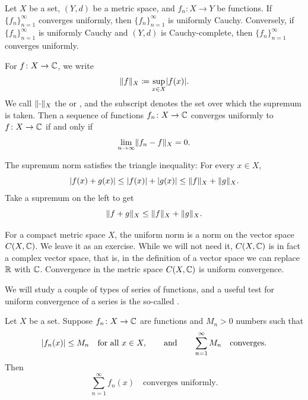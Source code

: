\begin{prop} \label{prop:unifcauchymetric}
Let $X$ be a set, $(Y,d)$ be a metric space, and
$f_n \colon X \to Y$ be functions.
If $\{ f_n \}_{n=1}^\infty$ converges uniformly,
then $\{f_n\}_{n=1}^\infty$ is uniformly Cauchy.  Conversely, if 
$\{f_n\}_{n=1}^\infty$ is uniformly Cauchy and $(Y,d)$ is Cauchy-complete,
then $\{f_n\}_{n=1}^\infty$ converges uniformly.
\end{prop}

For $f \colon X \to {\mathbb{C}}$, we write
\begin{equation*}
\lVert {f} \rVert_X \coloneqq \sup_{x \in X} \lvert {f(x)} \rvert .
\end{equation*}
We call $\lVert {\cdot} \rVert_X$
the \emph{} or \emph{},
and the subscript denotes the set over which the supremum is taken.
Then a sequence of functions
$f_n \colon X \to {\mathbb{C}}$ converges uniformly to $f \colon X \to {\mathbb{C}}$ if and only if
\begin{equation*}
\lim_{n\to \infty} \lVert {f_n-f} \rVert_X = 0 .
\end{equation*}

The supremum norm satisfies the triangle inequality: For every $x \in X$,
\begin{equation*}
\lvert {f(x)+g(x)} \rvert \leq
\lvert {f(x)} \rvert+\lvert {g(x)} \rvert \leq
\lVert {f} \rVert_X+\lVert {g} \rVert_X .
\end{equation*}
Take a supremum on the left to get
\begin{equation*}
\lVert {f+g} \rVert_X \leq
\lVert {f} \rVert_X+\lVert {g} \rVert_X .
\end{equation*}

For a compact metric space $X$,
the uniform norm is a norm on the vector space $C(X,{\mathbb{C}})$.
We leave it as an exercise.
While we will not need it, $C(X,{\mathbb{C}})$ is in fact a complex
vector space, that is, in the definition of a vector space we can replace
${\mathbb{R}}$ with ${\mathbb{C}}$.
Convergence in the metric space $C(X,{\mathbb{C}})$ is
uniform convergence.

We will study a couple of types of series of functions, and
a useful test for uniform convergence of a series is the 
so-called \emph{}.

\begin{thm} \label{thm:weiermtest}
Let $X$ be a set.
Suppose $f_n \colon X \to {\mathbb{C}}$ are functions and $M_n > 0$ numbers such
that
\begin{equation*}
\lvert {f_n(x)} \rvert\leq M_n \quad \text{for all } x \in X,
\qquad \text{and} \qquad
\sum_{n=1}^\infty M_n
\quad \text{converges}.
\end{equation*}
Then
\begin{equation*}
\sum_{n=1}^\infty f_n(x)
\quad \text{converges uniformly}.
\end{equation*}
\end{thm}

